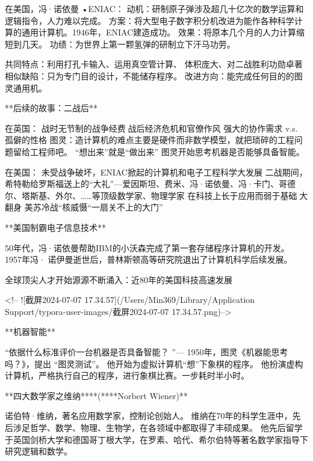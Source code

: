 在美国，冯·诺依曼 •ENIAC：
动机：研制原子弹涉及超几十亿次的数学运算和逻辑指令，人力难以完成。
方案：将大型电子数字积分机改进为能作各种科学计算的通用计算机。1946年，ENIAC建造成功。
效果：将原本几个月的人力计算缩短到几天。
功绩：为世界上第一颗氢弹的研制立下汗马功劳。



共同特点：利用打孔卡输入、运用真空管计算、
		   体积庞大、对二战胜利功勋卓著
相似缺陷：只为专门目的设计，不能储存程序。
改进方向：能完成任何目的的图灵通用机。



**后续的故事：二战后**



在英国：
战时无节制的战争经费战后经济危机和官僚作风
强大的协作需求 v.s. 孤僻的性格
图灵：造计算机的难点主要是硬件而非数学模型，就把琐碎的工程问题留给工程师吧。
“想出来”就是“做出来”
图灵开始思考机器是否能够具备智能。



在美国：
未受战争破坏，ENIAC掀起的计算机和电子工程科学大发展
二战期间，希特勒给罗斯福送上的“大礼”---爱因斯坦、费米、冯·诺依曼、冯·卡门、哥德尔、塔斯基、外尔、……等顶级数学家、物理学家
在科技上长于应用而弱于基础大翻身
美苏冷战“核威慑“一扇关不上的大门” 



**美国制霸电子信息技术**

50年代，冯·诺依曼帮助IBM的小沃森完成了第一套存储程序计算机的开发。
1957年冯· 诺伊曼逝世后，普林斯顿高等研究院退出了计算机科学后续发展。



全球顶尖人才开始源源不断涌入：近80年的美国科技高速发展

<!-- ![截屏2024-07-07 17.34.57](/Users/Min369/Library/Application Support/typora-user-images/截屏2024-07-07 17.34.57.png)-->



**机器智能**

“依据什么标准评价一台机器是否具备智能？ ”--- 1950年，图灵《机器能思考吗？》，提出 “图灵测试”。
他开始为虚拟计算机“想”下象棋的程序。
他扮演虚构计算机，严格执行自己的程序，进行象棋比赛。一步耗时半小时。



**四大数学家之维纳****(****Norbert Wiener)**

诺伯特·维纳，著名应用数学家，控制论创始人。
维纳在70年的科学生涯中，先后涉足哲学、数学、物理、生物学，在各领域中都取得了丰硕成果。
他先后留学于英国剑桥大学和德国哥丁根大学，在罗素、哈代、希尔伯特等著名数学家指导下研究逻辑和数学。




